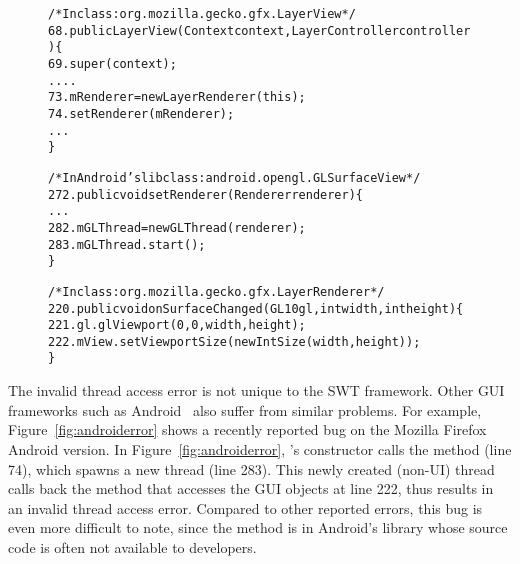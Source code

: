 \begin{figure}[t]
\begin{CodeOut}
\begin{alltt}

     /* In class: org.mozilla.gecko.gfx.LayerView */
68.  public LayerView(Context context, LayerController controller) \{
69.     super(context);
        ....
73.     mRenderer = new LayerRenderer(this);
74.     setRenderer(mRenderer);
        ...
     \}

     /* In Android's lib class: android.opengl.GLSurfaceView */
272. public void setRenderer(Renderer renderer) \{
        ...
282.    mGLThread = new GLThread(renderer);
283.    mGLThread.start();   
     \}

     /* In class: org.mozilla.gecko.gfx.LayerRenderer */
220. public void onSurfaceChanged(GL10 gl, int width, int height) \{
221.    gl.glViewport(0, 0, width, height);
222.    mView.setViewportSize(new IntSize(width, height));
     \}

\end{alltt}
\end{CodeOut}
\vspace*{-2.0ex}  %
\end{figure}

The invalid thread access error is not unique to the SWT framework. Other GUI frameworks
such as Android~\cite{android} also suffer from similar problems. For example, 
Figure~\ref{fig:androiderror} shows a recently reported bug on the Mozilla Firefox Android version.
In Figure~\ref{fig:androiderror}, 's constructor calls the
 method (line 74), which spawns a new thread (line 283).
This newly created (non-UI) thread calls back the  method that
accesses the GUI objects at line 222, thus results in an invalid thread access error.
Compared to other reported errors, this bug is even more difficult to note, since the  method is in Android's
library whose source code is often not available to developers.

